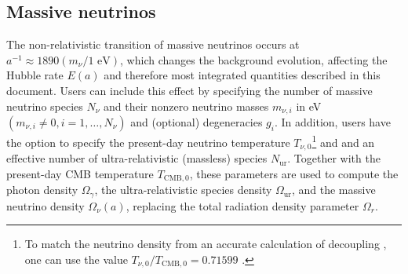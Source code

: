 
\subsection{Massive neutrinos}

The non-relativistic transition of massive neutrinos occurs at $a^{-1}\approx 1890 (m_\nu/1\text{ eV})$, which changes the background evolution, affecting the Hubble rate $E(a)$ and therefore most integrated quantities described in this document. Users can include this effect by specifying the number of massive neutrino species $N_\nu$ and their nonzero neutrino masses $m_{\nu,i}$ in eV $(m_{\nu,i}\neq 0, i=1,\dots,N_\nu)$ and (optional) degeneracies $g_i$. In addition, users have the option to specify the present-day neutrino temperature $T_{\nu,0}$\footnote{To match the neutrino density from an accurate calculation of decoupling \citep{Mangano2005}, one can use the value $T_{\nu,0}/T_{\mathrm{CMB},0}=0.71599$ \citep{Lesgourgues2011}.} and and an effective number of ultra-relativistic (massless) species $N_\mathrm{ur}$. Together with the present-day CMB temperature $T_{\mathrm{CMB},0}$, these parameters are used to compute the photon density $\Omega_\gamma$, the ultra-relativistic species density $\Omega_\mathrm{ur}$, and the massive neutrino density $\Omega_\nu(a)$, replacing the total radiation density parameter $\Omega_r$.

